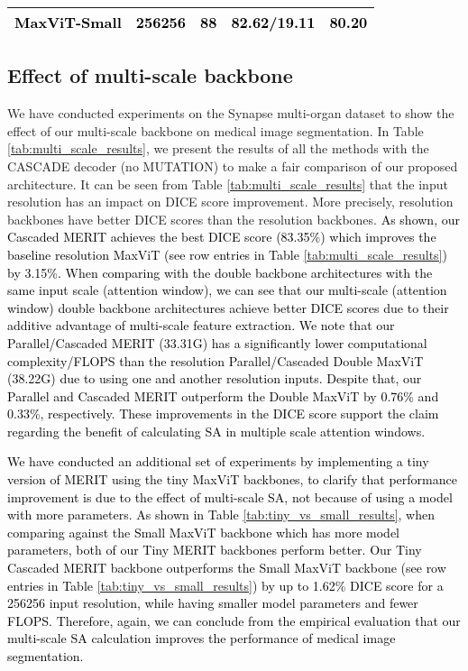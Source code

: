 \documentclass{midl}
\begin{document}
\begin{table*}[t]
{\begin{adjustbox}{width=1\textwidth}
{\begin{tabular}{lrrrr}
\textcolor{black}{MaxViT-Small}               & \textcolor{black}{256256}          & \textcolor{black}{88}                                                          & \textcolor{black}{82.62/19.11}                                                     & \textcolor{black}{80.20} \\
\bottomrule
\end{tabular}}
\end{adjustbox}
}
\end{table*}

\subsection{Effect of multi-scale backbone}
\label{assec:effect_multi_scale}
We have conducted experiments on the Synapse multi-organ dataset to show the effect of our multi-scale backbone on medical image segmentation. In Table \ref{tab:multi_scale_results}, we present the results of all the methods with the CASCADE decoder (no MUTATION) to make a fair comparison of our proposed architecture. It can be seen from Table \ref{tab:multi_scale_results} that the input resolution has an impact on DICE score improvement. More precisely,  resolution backbones have better DICE scores than the  resolution backbones. \textcolor{black}{As shown, our Cascaded MERIT achieves the best DICE score (83.35\%) which improves the baseline  resolution MaxViT (see  row entries in Table \ref{tab:multi_scale_results}) by 3.15\%. When comparing with the double backbone architectures with the same input scale (attention window), we can see that our multi-scale (attention window) double backbone architectures achieve better DICE scores due to their additive advantage of multi-scale feature extraction. We note that our Parallel/Cascaded MERIT (33.31G) has a significantly lower computational complexity/FLOPS than the  resolution Parallel/Cascaded Double MaxViT (38.22G) due to using one  and another  resolution inputs. Despite that, our Parallel and Cascaded MERIT outperform the Double MaxViT by 0.76\% and 0.33\%, respectively. These improvements in the DICE score support the claim regarding the benefit of calculating SA in multiple scale attention windows.}

 \textcolor{black}{We have conducted an additional set of experiments by implementing a tiny version of MERIT using the tiny MaxViT backbones, to clarify that performance improvement is due to the effect of multi-scale SA, not because of using a model with more parameters. As shown in Table \ref{tab:tiny_vs_small_results}, when comparing against the Small MaxViT backbone which has more model parameters, both of our Tiny MERIT backbones perform better. Our Tiny Cascaded MERIT backbone outperforms the Small MaxViT backbone (see  row entries in Table \ref{tab:tiny_vs_small_results}) by up to 1.62\% DICE score for a 256256 input resolution, while having  smaller model parameters and  fewer FLOPS. Therefore, again, we can conclude from the empirical evaluation that our multi-scale SA calculation improves the performance of medical image segmentation.}
\end{document}
